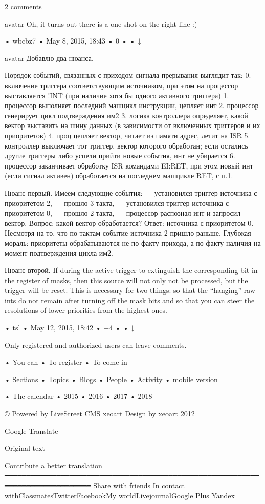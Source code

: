 2 comments

avatar
Oh, it turns out there is a one-shot on the right line :)

  • wbcbz7
  • May 8, 2015, 18:43
  • 
    0
  •  
  • ↓

avatar
Добавлю два нюанса.

Порядок событий, связанных с приходом сигнала прерывания выглядит так:
0. включение триггера соответствующим источником, при этом на процессор
выставляется !INT (при наличие хотя бы одного активного триггера)
1. процессор выполняет последний машцикл инструкции, цепляет инт
2. процессор генерирует цикл подтверждения им2
3. логика контроллера определяет, какой вектор выставить на шину данных (в
зависимости от включенных триггеров и их приоритетов)
4. проц цепляет вектор, читает из памяти адрес, летит на ISR
5. контроллер выключает тот триггер, вектор которого обработан; если остались
другие триггеры либо успели прийти новые события, инт не убирается
6. процессор заканчивает обработку ISR командами EI:RET, при этом новый инт
(если сигнал активен) обработается на последнем машцикле RET, с п.1.

Нюанс первый.
Имеем следующие события:
— установился триггер источника с приоритетом 2,
— прошло 3 такта,
— установился триггер источника с приоритетом 0,
— прошло 2 такта,
— процессор распознал инт и запросил вектор.
Вопрос: какой вектор обработается?
Ответ: источника с приоритетом 0. Несмотря на то, что по тактам событие
источника 2 пришло раньше.
Глубокая мораль: приоритеты обрабатываются не по факту прихода, а по факту
наличия на момент подтверждения цикла им2.

Нюанс второй.
If during the active trigger to extinguish the corresponding bit in the
register of masks, then this source will not only not be processed, but the
trigger will be reset. This is necessary for two things: so that the “hanging”
raw ints do not remain after turning off the mask bits and so that you can
steer the resolutions of lower priorities from the highest ones.

  • tsl
  • May 12, 2015, 18:42
  • 
    +4
  •  
  • ↓

Only registered and authorized users can leave comments.

  • You can
  • To register
  • To come in

  • Sections
  • Topics
  • Blogs
  • People
  • Activity
  • mobile version

  • The calendar
  • 2015
  • 2016
  • 2017
  • 2018

© Powered by LiveStreet CMS
xeoart Design by xeoart
2012
 

Google Translate

Original text

Contribute a better translation
━━━━━━━━━━━━━━━━━━━━━━━━━━━━━━━━━━━━━━━━━━━━━━━━━━━━━━━━━━━━━━━━━━━━━━━━━━━━━━━
Share with friends
In contact withClassmatesTwitterFacebookMy worldLivejournalGoogle Plus Yandex
